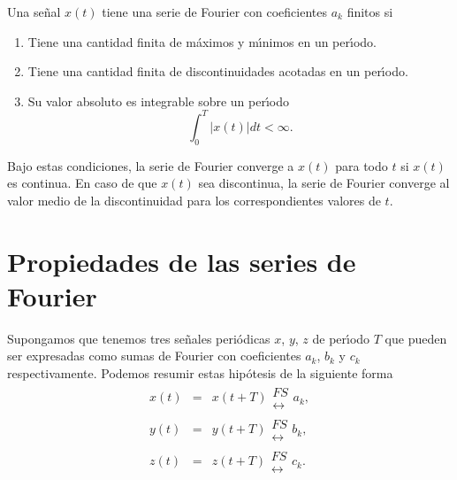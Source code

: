 Una se\~{n}al $x\left( t\right) $ tiene una serie de Fourier con coeficientes $a_{k}$ finitos si
\begin{enumerate}

\item  Tiene una cantidad finita de m\'{a}ximos y m\'{\i}nimos en un per\'{\i}odo.

\item  Tiene una cantidad finita de discontinuidades acotadas en un per\'{\i}odo.

\item  Su valor absoluto es integrable sobre un per\'{\i}odo 
\begin{equation}
\int_{0}^{T}\left| x\left( t\right) \right| dt<\infty .
\end{equation}

\end{enumerate}

Bajo estas condiciones, la serie de Fourier converge a $x(t)$ para todo $t$ si $x(t)$ es continua. 
En caso de que $x(t)$ sea discontinua, la serie de Fourier converge al valor medio de 
la discontinuidad para los correspondientes valores de $t$.

\section{Propiedades de las series de Fourier}

Supongamos que tenemos tres se\~{n}ales peri\'{o}dicas $x$, $y$, $z$ 
de per\'{\i}odo $T$ que pueden ser expresadas como sumas de Fourier 
con coeficientes $a_{k}$, $b_{k}$ y $c_{k}$ respectivamente. 
Podemos resumir estas hip\'{o}tesis de la siguiente forma 
\begin{eqnarray}
x\left( t\right) &=&x\left( t+T\right) 
\begin{array}{l}
FS \\ 
\longleftrightarrow
\end{array}
a_{k},  \label{xfs} \\
y\left( t\right) &=&y\left( t+T\right) 
\begin{array}{l}
FS \\ 
\longleftrightarrow
\end{array}
b_{k}, \label{yfs} \\
z\left( t\right) &=&z\left( t+T\right) 
\begin{array}{l}
FS \\ 
\longleftrightarrow
\end{array}
c_{k}. \label{zfs}
\end{eqnarray}

